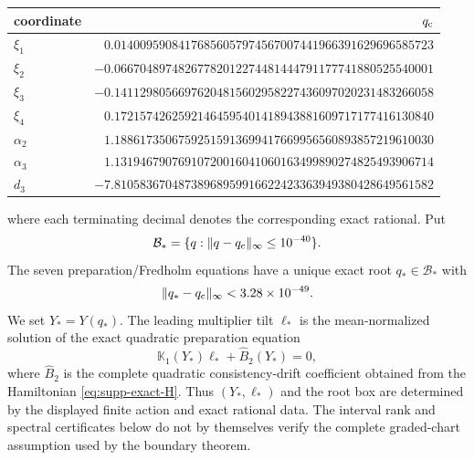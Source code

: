 \documentclass[11pt]{article}
\numberwithin{equation}{section}
\theoremstyle{definition}
\theoremstyle{remark}
\begin{document}
\begin{center}
\small
\begin{tabular}{@{}lr@{}}
\toprule
coordinate & $q_{\rm c}$\\
\midrule
$\xi_1$ & $0.01400959084176856057974567007441966391629696585723$\\
$\xi_2$ & $-0.06670489748267782012274481444791177741880525540001$\\
$\xi_3$ & $-0.14112980566976204815602958227436097020231483266058$\\
$\xi_4$ & $0.17215742625921464595401418943881609717177416130840$\\
$\alpha_2$ & $1.18861735067592515913699417669956560893857219610030$\\
$\alpha_3$ & $1.13194679076910720016041060163499890274825493906714$\\
$d_3$ & $-7.81058367048738968959916622423363949380428649561582$\\
\bottomrule
\end{tabular}
\end{center}
where each terminating decimal denotes the corresponding exact rational.
Put
\begin{equation}
 \mathcal B_*=\{q:\|q-q_{\rm c}\|_\infty\le10^{-40}\}.
 \label{eq:supp-certified-root-box}
\end{equation}
The seven preparation/Fredholm equations have a unique exact root
$q_*\in\mathcal B_*$ with
\begin{equation}
 \|q_*-q_{\rm c}\|_\infty<3.28\times10^{-49}.
 \label{eq:supp-certified-root-error}
\end{equation}
We set $Y_*=Y(q_*)$.  The leading multiplier tilt $\ell_*$ is the
mean-normalized solution of the exact quadratic preparation equation
\begin{equation}
 \mathbb K_1(Y_*)\ell_*+\widehat B_2(Y_*)=0,
 \label{eq:supp-certified-leading-tilt}
\end{equation}
where $\widehat B_2$ is the complete quadratic consistency-drift coefficient
obtained from the Hamiltonian \eqref{eq:supp-exact-H}.  Thus
$(Y_*,\ell_*)$ and the root box are determined by the displayed finite action
and exact rational data.  The interval rank and spectral certificates below
do not by themselves verify the complete graded-chart assumption used by the
boundary theorem.
\end{document}
